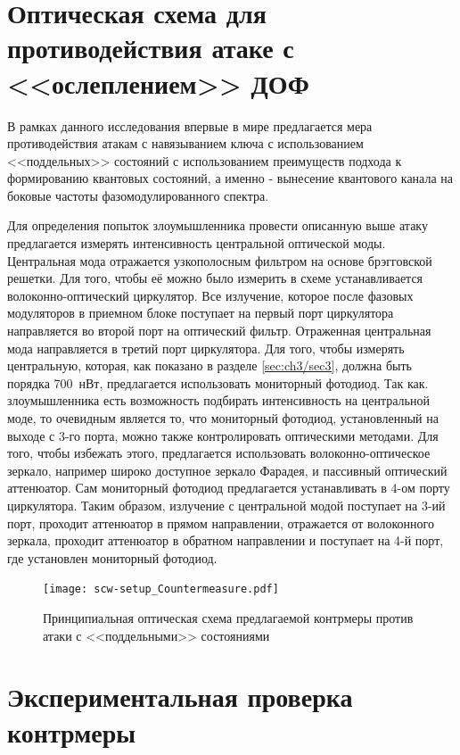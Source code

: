 \section{Оптическая схема для противодействия атаке с <<ослеплением>> ДОФ} \label{ch:ch3/sec4}

В рамках данного исследования впервые в мире предлагается мера противодействия атакам с навязыванием ключа с использованием <<поддельных>> состояний с использованием преимуществ подхода к формированию квантовых состояний, а именно - вынесение квантового канала на боковые частоты фазомодулированного спектра.

Для определения попыток злоумышленника провести описанную выше атаку предлагается измерять интенсивность центральной оптической моды. Центральная мода отражается узкополосным фильтром на основе брэгговской решетки. Для того, чтобы её можно было измерить в схеме устанавливается волоконно-оптический циркулятор. Все излучение, которое после фазовых модуляторов в приемном блоке поступает на первый порт циркулятора направляется во второй порт на оптический фильтр. Отраженная центральная мода направляется в третий порт циркулятора. Для того, чтобы измерять центральную, которая, как показано в разделе \ref{sec:ch3/sec3}, должна быть порядка 700~нВт, предлагается использовать мониторный фотодиод. Так как. злоумышленника есть возможность подбирать интенсивность на центральной моде, то очевидным является то, что мониторный фотодиод, установленный на выходе с 3-го порта, можно также контролировать оптическими методами. Для того, чтобы избежать этого, предлагается использовать волоконно-оптическое зеркало, например широко доступное зеркало Фарадея, и пассивный оптический аттенюатор. Сам мониторный фотодиод предлагается устанавливать в 4-ом порту циркулятора. Таким образом, излучение с центральной модой поступает на 3-ий порт, проходит аттенюатор в прямом направлении, отражается от волоконного зеркала, проходит аттенюатор в обратном направлении и поступает на 4-й порт, где установлен мониторный фотодиод.         
 \begin{figure}[ht]
  \centering
  \texttt{[image: scw-setup\_Countermeasure.pdf]}
  \caption{Принципиальная оптическая схема предлагаемой контрмеры против атаки с <<поддельными>> состояниями}
  \label{fig:countermeasure}
\end{figure}

\pagebreak

\section{Экспериментальная проверка контрмеры} \label{ch:ch3/sec5}


